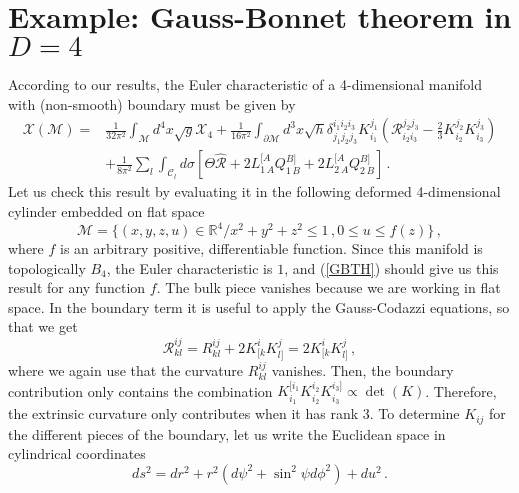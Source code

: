\documentclass[11pt,letterpaper]{article}
\begin{document}
\section{Example: Gauss-Bonnet theorem in $D=4$}
According to our results, the Euler characteristic of a 4-dimensional manifold with (non-smooth) boundary must be given by
\begin{equation}\label{GBTH}
\begin{aligned}
\mathcal{X}(\mathcal{M})=&\frac{1}{32\pi^2}\int_{\mathcal{M}}d^{4}x\sqrt{g}\mathcal{X}_4+ \frac{1}{16\pi^2}\int_{\partial \mathcal{M}}d^{3}x\sqrt{h}\delta^{i_1i_2i_3}_{j_1j_2j_3}K^{j_1}_{i_1}\left(\mathcal{R}^{j_2 j_3}_{i_2i_3}-\frac{2}{3}K^{j_2}_{i_2}K^{j_3}_{i_3}\right)\\
&+\frac{1}{8\pi^2}\sum_l\int_{\mathcal{C}_l}d\sigma \left[\Theta\hat{\mathcal{R}}+2L^{[A}_{1\, A}Q^{B]}_{1\, B}+2L^{[A}_{2\, A}Q^{B]}_{2\, B}\right]\, .
\end{aligned}
\end{equation}
Let us check this result by evaluating it in the following deformed 4-dimensional cylinder embedded on flat space
\begin{equation}
\mathcal{M}=\big\{(x,y,z,u)\in \mathbb{R}^4/ x^2+y^2+z^2\le1\, , 0\le u\le f(z)\big\}\, ,
\end{equation}
where $f$ is an arbitrary positive, differentiable function. Since this manifold is topologically $B_4$, the Euler characteristic is $1$, and (\ref{GBTH}) should give us this result for any function $f$. The bulk piece vanishes because we are working in flat space. In the boundary term it is useful to apply the Gauss-Codazzi equations, so that we get
\begin{equation}
\mathcal{R}^{ij}_{kl}=R^{ij}_{kl}+2K^{i}_{[k}K^{j}_{l]}=2K^{i}_{[k}K^{j}_{l]}\, ,
\end{equation}
where we again use that the curvature $R^{ij}_{kl}$ vanishes. Then, the boundary contribution only contains the combination $K^{[i_1}_{i_1}K^{i_2}_{i_2}K^{i_3]}_{i_3}\propto \det(K)$. Therefore, the extrinsic curvature only contributes when it has rank 3. To determine $K_{ij}$ for the different pieces of the boundary, let us write the Euclidean space in cylindrical  coordinates
\begin{equation}
ds^2=dr^2+r^2(d\psi^2+\sin^2\psi d\phi^2)+du^2\, .
\end{equation}
\end{document}
